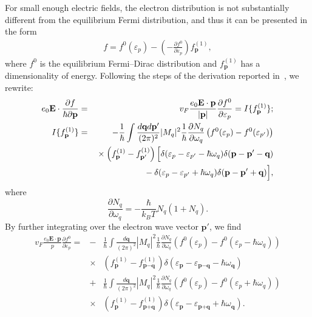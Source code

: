 For small enough electric fields, the electron distribution is not substantially different from the equilibrium Fermi distribution, and thus it can be presented in the form
%
\begin{eqnarray}
f=f^0(\varepsilon_p)-\left(-\frac{\partial f^0}{\partial\varepsilon_p}\right)f^{(1)}_\textbf{p},
\end{eqnarray}
where $f^0$ is the equilibrium Fermi--Dirac distribution and $f^{(1)}_\textbf{p}$ has a dimensionality of energy.
%
Following the steps of the derivation reported in~\cite{Zaitsev:2014aa}, we rewrite:
%
\begin{eqnarray}
\label{AP6_A3}
e_0\textbf{E}\cdot\frac{\partial f}{\hbar\partial \textbf{p}}&=&v_F\frac{e_0\textbf{E}\cdot\textbf{p}}{|\mathbf{p}|}\frac{\partial f^0}{\partial \varepsilon_p}=I\{f^{(1)}_\textbf{p}\};\\\nonumber
I\{f^{(1)}_\textbf{p}\}&=&-\frac{1}{\hbar}\int\frac{d\textbf{q}d\textbf{p}'}{(2\pi)^2}|M_q|^2\frac{1}{\hbar}\frac{\partial N_q}{\partial \omega_q}
\left(f^0(\varepsilon_p)-f^0(\varepsilon_{p'})\right)\\\nonumber
&{}&{}\times\left(f^{(1)}_{\textbf{p}}-f^{(1)}_{\textbf{p}'}\right)
\Bigl[\delta(\varepsilon_{p}-\varepsilon_{p'}-\hbar\omega_q)\delta(\textbf{p}-\textbf{p}'-\textbf{q})\nonumber\\
&{}&{}-\delta(\varepsilon_{p}-\varepsilon_{p'}+\hbar\omega_q)\delta(\textbf{p}-\textbf{p}'+\textbf{q})\Bigr],
\end{eqnarray}
where $$\frac{\partial N_q}{\partial \omega_q}=-\frac{\hbar}{k_BT}N_q(1+N_q).$$
By further integrating over the electron wave vector $\textbf{p}'$, we find
%
\begin{eqnarray}
\label{AP6_A4}
v_F\frac{e_0\textbf{E}\cdot\textbf{p}}{p}\frac{\partial f^0}{\partial \varepsilon_p}
=&-&\frac{1}{\hbar}\int\frac{d\textbf{q}}{(2\pi)^2}|M_q|^2\frac{1}{\hbar}\frac{\partial N_q}{\partial \omega_q}
\left(f^0(\varepsilon_p)-f^0(\varepsilon_{p}-\hbar\omega_q)\right)\\ \nonumber
&\times&\left(f^{(1)}_{\textbf{p}}-f^{(1)}_{\textbf{p}-\textbf{q}}\right)
\delta(\varepsilon_{\textbf{p}}-\varepsilon_{\textbf{p}-\textbf{q}}-\hbar\omega_\textbf{q})\\
\nonumber
&+&\frac{1}{\hbar}\int\frac{d\textbf{q}}{(2\pi)^2}|M_q|^2\frac{1}{\hbar}\frac{\partial N_q}{\partial \omega_q}
\left(f^0(\varepsilon_p)-f^0(\varepsilon_{p}+\hbar\omega_q)\right)\\ \nonumber
&\times&\left(f^{(1)}_{\textbf{p}}-f^{(1)}_{\textbf{p}+\textbf{q}}\right)
\delta(\varepsilon_{\textbf{p}}-\varepsilon_{\textbf{p}+\textbf{q}}+\hbar\omega_\textbf{q}).
\end{eqnarray}
